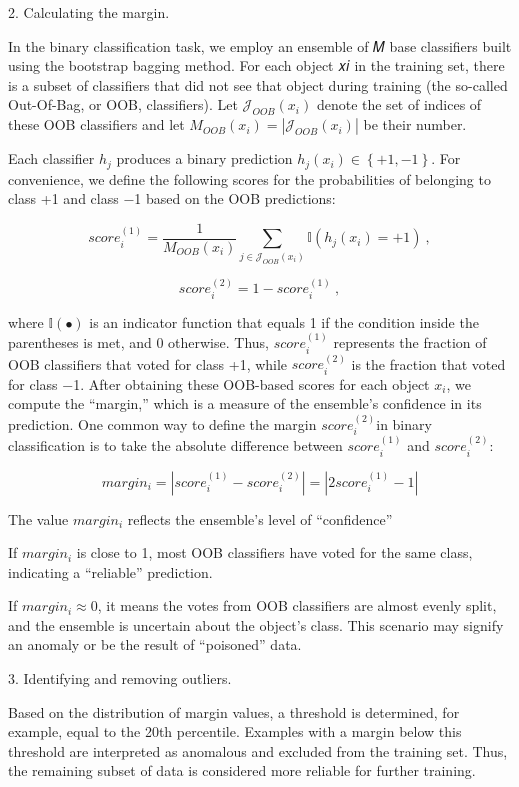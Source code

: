 2. Calculating the margin.

In the binary classification task, we employ an ensemble of 𝑀 base
classifiers built using the bootstrap bagging method. For each object 𝑥𝑖
in the training set, there is a subset of classifiers that did not see
that object during training (the so-called Out-Of-Bag, or OOB,
classifiers). Let \(\mathcal{J}_{OOB}(x_{i})\) denote the set of indices
of these OOB classifiers and let
\(M_{OOB}\left( x_{i} \right) = \left| \mathcal{J}_{OOB}(x_{i}) \right|\)
be their number.

Each classifier \(h_{j}\) produces a binary prediction
\(h_{j}(x_{i}) \in \left\{ + 1, - 1 \right\}\). For convenience, we
define the following scores for the probabilities of belonging to class
+1 and class −1 based on the OOB predictions:

\[score_{i}^{(1)} = \frac{1}{M_{OOB}(x_{i})}\sum_{j \in \mathcal{J}_{OOB}(x_{i})}^{}{\mathbb{I}\left( h_{j}\left( x_{i} \right) = + 1 \right)\ ,}\]

\[score_{i}^{(2)} = 1 - score_{i}^{(1)}\ ,\]

where \(\mathbb{I( \bullet )}\) is an indicator function that equals 1
if the condition inside the parentheses is met, and 0 otherwise. Thus,
\(score_{i}^{(1)}\) represents the fraction of OOB classifiers that
voted for class +1, while \(score_{i}^{(2)}\) is the fraction that voted
for class −1. After obtaining these OOB-based scores for each object
\(x_{i}\), we compute the ``margin,'' which is a measure of the
ensemble's confidence in its prediction. One common way to define the
margin \(score_{i}^{(2)}\)in binary classification is to take the
absolute difference between \(score_{i}^{(1)}\) and \(score_{i}^{(2)}\):

\[margin_{i} = \left| score_{i}^{(1)} - score_{i}^{(2)} \right| = \left| 2score_{i}^{(1)} - 1 \right|\]

The value \(margin_{i}\) reflects the ensemble's level of ``confidence''

If \(margin_{i}\) is close to 1, most OOB classifiers have voted for the
same class, indicating a ``reliable'' prediction.

If \(margin_{i} \approx 0\), it means the votes from OOB classifiers are
almost evenly split, and the ensemble is uncertain about the object's
class. This scenario may signify an anomaly or be the result of
``poisoned'' data.

3. Identifying and removing outliers.

Based on the distribution of margin values, a threshold is determined,
for example, equal to the 20th percentile. Examples with a margin below
this threshold are interpreted as anomalous and excluded from the
training set. Thus, the remaining subset of data is considered more
reliable for further training.

